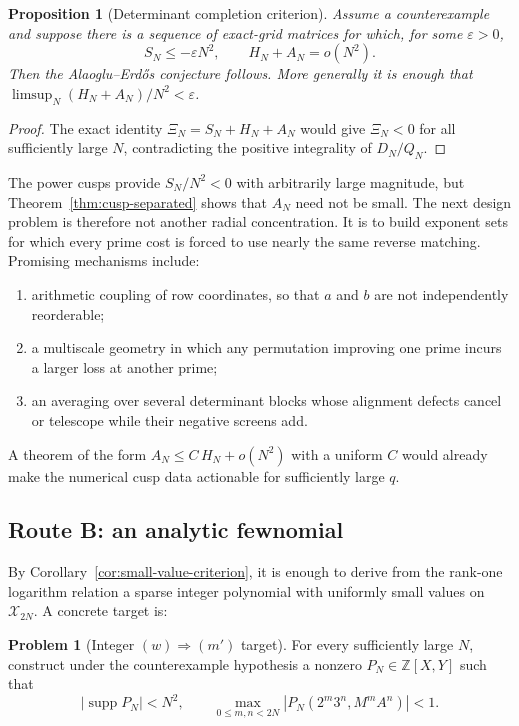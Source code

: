 \documentclass[11pt]{article}
\newcommand{\Z}{\mathbb Z}
\newcommand{\supp}{\operatorname{supp}}
\newcommand{\1}{\mathbf 1}
\theoremstyle{plain}
\newtheorem{proposition}[theorem]{Proposition}
\theoremstyle{definition}
\newtheorem{problem}[theorem]{Problem}
\theoremstyle{remark}
\begin{document}
\begin{proposition}[Determinant completion criterion]\label{prop:det-completion}
Assume a counterexample and suppose there is a sequence of exact-grid
matrices for which, for some $\varepsilon>0$,
\begin{equation}\label{eq:det-completion}
 S_N\le-\varepsilon N^2,
 \qquad
 H_N+A_N=o(N^2).
\end{equation}
Then the Alaoglu--Erd\H{o}s conjecture follows.
More generally it is enough that
$\limsup_N(H_N+A_N)/N^2<\varepsilon$.
\end{proposition}

\begin{proof}
The exact identity
$\Xi_N=S_N+H_N+A_N$ would give $\Xi_N<0$ for all sufficiently large $N$,
contradicting the positive integrality of $D_N/Q_N$.
\end{proof}

The power cusps provide $S_N/N^2<0$ with arbitrarily large magnitude, but
Theorem~\ref{thm:cusp-separated} shows that $A_N$ need not be small.  The
next design problem is therefore not another radial concentration.  It is to
build exponent sets for which every prime cost is forced to use nearly the
same reverse matching.  Promising mechanisms include:
\begin{enumerate}[leftmargin=2.2em]
\item arithmetic coupling of row coordinates, so that $a$ and $b$ are not
      independently reorderable;
\item a multiscale geometry in which any permutation improving one prime
      incurs a larger loss at another prime;
\item an averaging over several determinant blocks whose alignment defects
      cancel or telescope while their negative screens add.
\end{enumerate}
A theorem of the form
$A_N\le C\,H_N+o(N^2)$ with a uniform $C$ would already make the numerical
cusp data actionable for sufficiently large $q$.

\subsection{Route B: an analytic fewnomial}

By Corollary~\ref{cor:small-value-criterion}, it is enough to derive from the
rank-one logarithm relation a sparse integer polynomial with uniformly small
values on $\mathcal X_{2N}$.  A concrete target is:

\begin{problem}[Integer $(w)\Rightarrow(m')$ target]\label{prob:fewnomial-target}
For every sufficiently large $N$, construct under the counterexample
hypothesis a nonzero $P_N\in\Z[X,Y]$ such that
\begin{equation}\label{eq:fewnomial-target}
 |\supp P_N|<N^2,
 \qquad
 \max_{0\le m,n<2N}
 |P_N(2^m3^n,M^mA^n)|<1.
\end{equation}
\end{problem}
\end{document}

